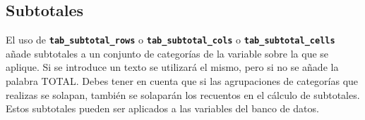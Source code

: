 \documentclass[
]{book}
\newenvironment{Shaded}{\begin{snugshade}}{\end{snugshade}}
\newcommand{\AttributeTok}[1]{\textcolor[rgb]{0.77,0.63,0.00}{#1}}
\newcommand{\DecValTok}[1]{\textcolor[rgb]{0.00,0.00,0.81}{#1}}
\newcommand{\FunctionTok}[1]{\textcolor[rgb]{0.00,0.00,0.00}{#1}}
\newcommand{\NormalTok}[1]{#1}
\newcommand{\OtherTok}[1]{\textcolor[rgb]{0.56,0.35,0.01}{#1}}
\newcommand{\SpecialCharTok}[1]{\textcolor[rgb]{0.00,0.00,0.00}{#1}}
\newcommand{\StringTok}[1]{\textcolor[rgb]{0.31,0.60,0.02}{#1}}
\begin{document}
\hypertarget{subtotales}{%
\subsection{Subtotales}\label{subtotales}}

El uso de \textbf{\texttt{tab\_subtotal\_rows}} o \textbf{\texttt{tab\_subtotal\_cols}} o \textbf{\texttt{tab\_subtotal\_cells}} añade subtotales a un conjunto de categorías de la variable sobre la que se aplique. Si se introduce un texto se utilizará el mismo, pero si no se añade la palabra TOTAL. Debes tener en cuenta que si las agrupaciones de categorías que realizas se solapan, también se solaparán los recuentos en el cálculo de subtotales. Estos subtotales pueden ser aplicados a las variables del banco de datos.

\begin{Shaded}
\end{Shaded}
\end{document}
